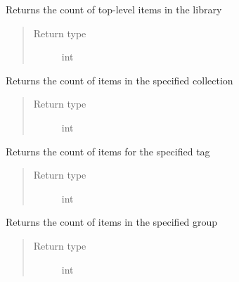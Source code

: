 \documentclass[letterpaper,10pt,english]{sphinxmanual}
\begin{document}
\begin{fulllineitems}
\label{index:pyzotero.zotero.Zotero.num_items}
Returns the count of top-level items in the library
\begin{quote}\begin{description}
\item[{Return type}] \leavevmode
int

\end{description}\end{quote}

\end{fulllineitems}


\begin{fulllineitems}
\label{index:pyzotero.zotero.Zotero.num_collectionitems}
Returns the count of items in the specified collection
\begin{quote}\begin{description}
\item[{Return type}] \leavevmode
int

\end{description}\end{quote}

\end{fulllineitems}


\begin{fulllineitems}
\label{index:pyzotero.zotero.Zotero.num_tagitems}
Returns the count of items for the specified tag
\begin{quote}\begin{description}
\item[{Return type}] \leavevmode
int

\end{description}\end{quote}

\end{fulllineitems}


\begin{fulllineitems}
\label{index:pyzotero.zotero.Zotero.num_groupitems}
Returns the count of items in the specified group
\begin{quote}\begin{description}
\item[{Return type}] \leavevmode
int

\end{description}\end{quote}

\end{fulllineitems}
\end{document}
